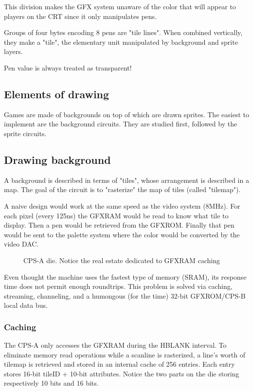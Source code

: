 This division makes the GFX system unaware of the color that will appear to players on the CRT since it only manipulates pens.




Groups of four bytes encoding 8 pens are "tile lines". When combined vertically, they make a "tile", the elementary unit manipulated by background and sprite layers.


 \begin{trivia}
 Pen value  is always treated as transparent!
 \end{trivia}



\subsection{Elements of drawing}

Games are made of backgrounds on top of which are drawn sprites. The easiest to implement are the background circuits. They are studied first, followed by the sprite circuits.

\subsection{Drawing background}

A background is described in terms of "tiles", whose arrangement is described in a map. The goal of the circuit is to "rasterize" the map of tiles (called "tilemap").

A naive design would work at the same speed as the video system (8MHz). For each pixel (every 125ns) the GFXRAM would be read to know what tile to display. Then a pen would be retrieved from the GFXROM. Finally that pen would be sent to the palette system where the color would be converted by the video DAC.

 \begin{figure}[H]%
 \caption*{CPS-A die. Notice the real estate dedicated to GFXRAM caching}%
 \end{figure}%

 Even thought the machine uses the fastest type of memory (SRAM), its response time does not permit enough roundtrips. This problem is solved via caching, streaming, channeling, and a humongous (for the time) 32-bit GFXROM/CPS-B local data bus. 


\subsubsection{Caching}
The CPS-A only accesses the GFXRAM during the HBLANK interval. To eliminate memory read operations while a scanline is rasterized, a line's worth of tilemap is retrieved and stored in an internal cache of 256 entries. Each entry stores 16-bit  tileID + 10-bit attributes. Notice the two parts on the die storing respectively 10 bits and 16 bits.





